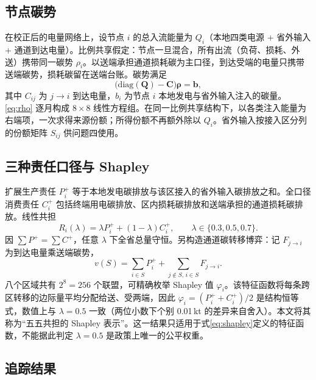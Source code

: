 \documentclass[UTF8,a4paper,zihao=-4,fontset=fandol]{ctexart}
\begin{document}
\subsection{节点碳势}

在校正后的电量网络上，设节点 $i$ 的总入流能量为 $Q_i$（本地四类电源 + 省外输入 + 通道到达电量）。比例共享假定：节点一旦混合，所有出流（负荷、损耗、外送）携带同一碳势 $\rho_i$\cite{Bialek1996tracing,Kang2015carbon}。以送端承担通道损耗碳为主口径，到达受端的电量只携带送端碳势，损耗碳留在送端台账。碳势满足
\begin{equation}
\bigl(\mathrm{diag}(\boldsymbol Q)-\boldsymbol C\bigr)\boldsymbol\rho=\boldsymbol b,
\label{eq:rho}
\end{equation}
其中 $C_{ij}$ 为 $j\to i$ 到达电量，$b_i$ 为节点 $i$ 本地发电与省外输入注入的碳量。\eqref{eq:rho} 逐月构成 $8\times 8$ 线性方程组。在同一比例共享结构下，以各类注入能量为右端项，一次求得来源份额；所得份额不再额外除以 $Q_i$。省外输入按接入区分列的份额矩阵 $S_{ij}$ 供问题四使用。

\subsection{三种责任口径与 Shapley}

扩展生产责任 $P^+_i$ 等于本地发电碳排放与该区接入的省外输入碳排放之和\cite{Peters2008production}。全口径消费责任 $C^+_i$ 包括终端用电碳排放、区内损耗碳排放和送端承担的通道损耗碳排放\cite{Davis2010consumption}。线性共担\cite{Gallego2005consistent,Lenzen2007shared}
\begin{equation}
R_i(\lambda)=\lambda P^+_i+(1-\lambda)C^+_i,\qquad \lambda\in\{0.3,0.5,0.7\}.
\label{eq:lambda}
\end{equation}
因 $\sum P^+=\sum C^+$，任意 $\lambda$ 下全省总量守恒。另构造通道碳转移博弈：记 $F_{j\to i}$ 为到达电量乘送端碳势，
\begin{equation}
v(S)=\sum_{i\in S}P^+_i+\sum_{j\notin S,\,i\in S}F_{j\to i}.
\label{eq:shapley}
\end{equation}
八个区域共有 $2^8=256$ 个联盟，可精确枚举 Shapley 值 $\varphi_i$\cite{Qin2020cooperative}。该特征函数将每条跨区转移的边际量平均分配给送、受两端，因此 $\varphi_i=(P_i^++C_i^+)/2$ 是结构恒等式，数值上与 $\lambda=0.5$ 一致（两位小数下个别 0.01\,kt 的差异来自舍入）。本文将其称为“五五共担的 Shapley 表示”。这一结果只适用于式\eqref{eq:shapley}定义的特征函数，不能据此判定 $\lambda=0.5$ 是政策上唯一的公平权重。

\subsection{追踪结果}
\end{document}
